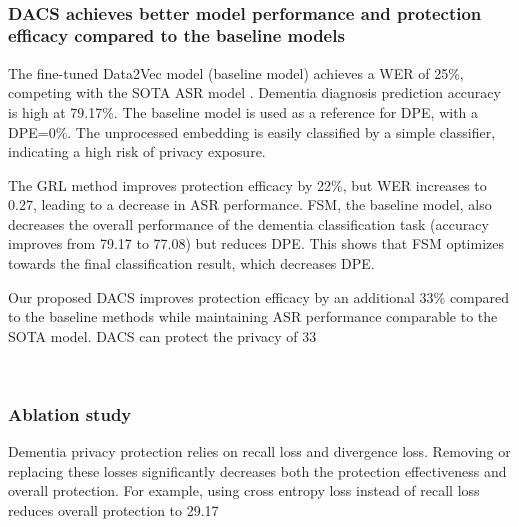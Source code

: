 \
\subsubsection{DACS achieves better model performance and protection efficacy compared to the baseline models}

The fine-tuned Data2Vec model (baseline model) achieves a WER of 25\%, competing with the SOTA ASR model \cite{pan2020improving}. Dementia diagnosis prediction accuracy is high at 79.17\%. The baseline model is used as a reference for DPE, with a DPE=0\%. The unprocessed embedding is easily classified by a simple classifier, indicating a high risk of privacy exposure.

The GRL method improves protection efficacy by 22\%, but WER increases to 0.27, leading to a decrease in ASR performance. FSM, the baseline model, also decreases the overall performance of the dementia classification task (accuracy improves from 79.17 to 77.08) but reduces DPE. This shows that FSM optimizes towards the final classification result, which decreases DPE.

Our proposed DACS improves protection efficacy by an additional 33\% compared to the baseline methods while maintaining ASR performance comparable to the SOTA model. DACS can protect the privacy of 33%

\
\subsubsection{Ablation study}

Dementia privacy protection relies on recall loss and divergence loss. Removing or replacing these losses significantly decreases both the protection effectiveness and overall protection. For example, using cross entropy loss instead of recall loss reduces overall protection to 29.17%

